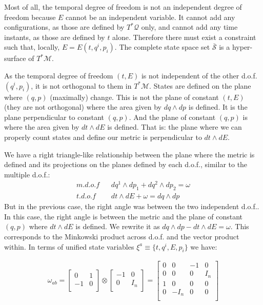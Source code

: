 \documentclass[aps,pra,10pt,twocolumn,floatfix,nofootinbib]{revtex4-1}
\numberwithin{equation}{section}
\theoremstyle{definition}
\begin{document}
Most of all, the temporal degree of freedom is not an independent degree of freedom because $E$ cannot be an independent variable. It cannot add any configurations, as those are defined by $T^*\mathcal{Q}$ only, and cannot add any time instants, as those are defined by $t$ alone. Therefore there must exist a constraint such that, locally, $E=E(t,q^i,p_i)$. The complete state space set $\bar{\mathcal{S}}$ is a hyper-surface of $T^*\mathcal{M}$.

As the temporal degree of freedom $(t, E)$ is not independent of the other d.o.f. $(q^i, p_i)$, it is not orthogonal to them in $T^*\mathcal{M}$. States are defined on the plane where $( q, p )$ (maximally) change. This is not the plane of constant $( t, E )$ (they are not orthogonal) where the area given by $dq \wedge dp$ is defined. It is the plane perpendicular to constant $( q, p )$. And the plane of constant $( q, p )$ is where the area given by $dt \wedge dE$ is defined. That is: the plane where we can properly count states and define our metric is perpendicular to $dt \wedge dE$.

We have a right triangle-like relationship between the plane where the metric is defined and its projections on the planes defined by each d.o.f., similar to the multiple d.o.f.:
\begin{align*}
m.d.o.f \;\;\; &dq^1 \wedge dp_1 + dq^2 \wedge dp_2 = \omega \\
t.d.o.f \;\;\; &dt \wedge dE + \omega = dq \wedge dp
\end{align*}
But in the previous case, the right angle was between the two independent d.o.f.. In this case, the right angle is between the metric and the plane of constant $(q, p)$ where $dt \wedge dE$ is defined. We rewrite it as $dq \wedge dp - dt \wedge dE = \omega$. This corresponds to the Minkowski product across d.o.f. and the vector product within. In terms of unified state variables $\xi^a\equiv \{t, q^i, E, p_i\}$ we have:

\begin{align*}
\omega_{ab} =  \left[
\begin{array}{cc}
0 & 1 \\
-1 & 0 \\
\end{array}
\right] \otimes \left[
\begin{array}{cc}
-1 & 0 \\
0 & I_n \\
\end{array}
\right] =
\left[
\begin{array}{cccc}
0 & 0 & -1 & 0 \\
0 & 0 & 0 & I_n \\
1 & 0 & 0 & 0 \\
0 & -I_n & 0& 0 \\
\end{array}
\right] \\
\end{align*}
\end{document}
